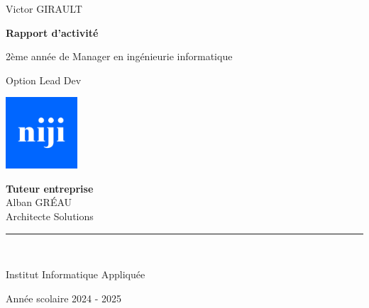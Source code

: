 \documentclass[12pt]{article}
\begin{document}
\begin{titlepage}
  {\Huge Victor GIRAULT\par}
  \vspace*{2cm}
  {\Huge \textbf{Rapport d'activité}}\par
  \vspace{.5cm}
  {\LARGE 2ème année de Manager en ingénieurie informatique}\par
  \vspace{0.4cm}
  {\Large Option Lead Dev}\par
  \vfill
    \includegraphics[width=0.2\textwidth]{img/logo-niji.png}\par
\vfill
  \begin{center}
    \textbf{Tuteur entreprise\\}
    Alban GRÉAU\\
    Architecte Solutions\\[2.5cm]
    \hspace{2cm}\rule{8cm}{0.5pt}\\
  \end{center}
  \vfill
  \begin{minipage}{0.55\textwidth}
    \raggedright
    {\large Institut Informatique Appliquée\par}
  \end{minipage}
  \hfill
  \begin{minipage}{0.4\textwidth}
    \raggedleft
    {\large Année scolaire 2024 - 2025\par}
  \end{minipage}
\end{titlepage}

\newpage
\tableofcontents
\thispagestyle{empty}
\newpage
\listoffigures
\thispagestyle{empty}
\newpage
\setcounter{page}{1}
\end{document}
